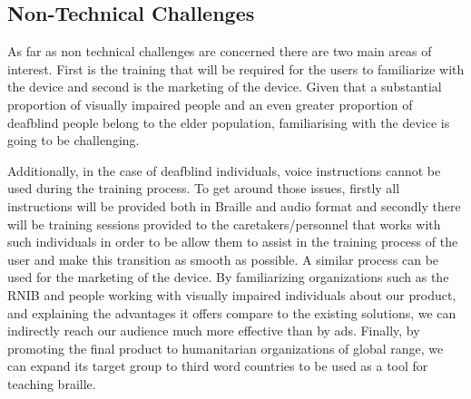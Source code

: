 \subsection{Non-Technical Challenges}
As far as non technical challenges are concerned there are two main areas of interest.
First is the training that will be required for the users to familiarize with the device and second is the marketing of the device.
Given that a substantial proportion of visually impaired people and an even greater proportion of deafblind people belong to the elder population, familiarising with the device is going to be challenging.

Additionally, in the case of deafblind individuals, voice instructions cannot be used during the training process.
To get around those issues, firstly all instructions will be provided both in Braille and audio format and secondly there will be training sessions provided to the caretakers/personnel that works with such individuals in order to be allow them to assist in the training process of the user and make this transition as smooth as possible.
A similar process can be used for the marketing of the device.
By familiarizing organizations such as the RNIB and people working with visually impaired individuals about our product, and explaining the advantages it offers compare to the existing solutions, we can indirectly reach our audience much more effective than by ads. Finally, by promoting the final product to humanitarian organizations of global range, we can expand its target group to third word countries to be used as a tool for teaching braille. 
 